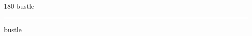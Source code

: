 
\begin{frame}
\begin{center}
\begin{turn}{180}
{\fontsize{2.5cm}{1em}\selectfont bustle}
\end{turn}
\vspace{1em}\par  
\hrule
\vspace{1em}\par  
{\fontsize{2.5cm}{1em}\selectfont bustle}
\end{center}
\end{frame}
